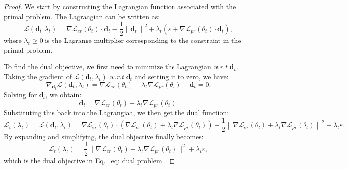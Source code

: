 \begin{proof}
We start by constructing the Lagrangian function associated with the primal problem. The Lagrangian can be written as:
\begin{equation}
    \mathcal{L}(\mathbf{d}_t, \lambda_t) = \nabla \mathcal{L}_{er}(\theta_t) \cdot \mathbf{d}_t - \frac{1}{2} \left\|\mathbf{d}_t\right\|^2 + \lambda_t \left(\varepsilon + \nabla \mathcal{L}_{pr}(\theta_t) \cdot \mathbf{d}_t\right),
\end{equation}
where $\lambda_t \geq 0$ is the Lagrange multiplier corresponding to the constraint in the primal problem.

To find the dual objective, we first need to minimize the Lagrangian \textit{w.r.t} $\mathbf{d}_t$. Taking the gradient of $\mathcal{L}(\mathbf{d}_t, \lambda_t)$ \textit{w.r.t} $\mathbf{d}_t$ and setting it to zero, we have:
\begin{equation}
    \nabla_{\mathbf{d}_t} \mathcal{L}(\mathbf{d}_t, \lambda_t) = \nabla \mathcal{L}_{er}(\theta_t) + \lambda_t \nabla \mathcal{L}_{pr}(\theta_t) - \mathbf{d}_t = 0.
\end{equation}
Solving for $\mathbf{d}_t$, we obtain:
\begin{equation}
    \mathbf{d}_t = \nabla \mathcal{L}_{er}(\theta_t) + \lambda_t \nabla \mathcal{L}_{pr}(\theta_t).
\end{equation}
Substituting this back into the Lagrangian, we then get the dual function:
\begin{equation}
    \mathcal{L}_t(\lambda_t) = \mathcal{L}(\mathbf{d}_t, \lambda_t) = \nabla \mathcal{L}_{er}(\theta_t) \cdot (\nabla \mathcal{L}_{er}(\theta_t) + \lambda_t \nabla \mathcal{L}_{pr}(\theta_t)) - \frac{1}{2} \left\|\nabla \mathcal{L}_{er}(\theta_t) + \lambda_t \nabla \mathcal{L}_{pr}(\theta_t)\right\|^2 + \lambda_t \varepsilon.
\end{equation}
By expanding and simplifying, the dual objective finally becomes:
\begin{equation}
    \mathcal{L}_{t}(\lambda_t) =  \frac12 \big\| \nabla \mathcal L_{er}(\theta_t) + \lambda_t \nabla \mathcal L_{pr}(\theta_t) \big\|^2 + \lambda_t \varepsilon,
\end{equation}
which is the dual objective in Eq.~\ref{eq: dual problem}.
\end{proof}



